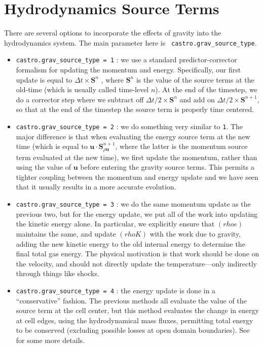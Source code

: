 \section{Hydrodynamics Source Terms}

There are several options to incorporate the effects of gravity into
the hydrodynamics system.  The main parameter here is {\tt
  castro.grav\_source\_type}.

\begin{itemize}

\item {\tt castro.grav\_source\_type = 1} : we use a
  standard predictor-corrector formalism for updating the momentum and
  energy. Specifically, our first update is equal to $\Delta t \times
  \mathbf{S}^n$ , where $\mathbf{S}^n$ is the value of the source
  terms at the old-time (which is usually called time-level $n$).  At
  the end of the timestep, we do a corrector step where we subtract
  off $\Delta t / 2 \times \mathbf{S}^n$ and add on $\Delta t / 2
  \times \mathbf{S}^{n+1}$, so that at the end of the timestep the
  source term is properly time centered.

\item {\tt castro.grav\_source\_type = 2} : we do something very
  similar to {\tt 1}. The major difference is that when evaluating the
  energy source term at the new time (which is equal to $\mathbf{u}
  \cdot \mathbf{S}^{n+1}_{\rho \mathbf{u}}$, where the latter is the
  momentum source term evaluated at the new time), we first update the
  momentum, rather than using the value of $\mathbf{u}$ before
  entering the gravity source terms. This permits a tighter coupling
  between the momentum and energy update and we have seen that it
  usually results in a more accurate evolution.

\item {\tt castro.grav\_source\_type = 3} : we do the same momentum
  update as the previous two, but for the energy update, we put all of
  the work into updating the kinetic energy alone. In particular, we
  explicitly ensure that $(rho e)$ maintains the same, and update
  $(rho K)$ with the work due to gravity, adding the new kinetic
  energy to the old internal energy to determine the final total gas
  energy.  The physical motivation is that work should be done on the
  velocity, and should not directly update the temperature---only
  indirectly through things like shocks.

\item {\tt castro.grav\_source\_type = 4} : the energy update is done
  in a ``conservative'' fashion.  The previous methods all evaluate
  the value of the source term at the cell center, but this method
  evaluates the change in energy at cell edges, using the
  hydrodynamical mass fluxes, permitting total energy to be conserved
  (excluding possible losses at open domain boundaries).  See
  \cite{katzthesis} for some more details.
\end{itemize}
